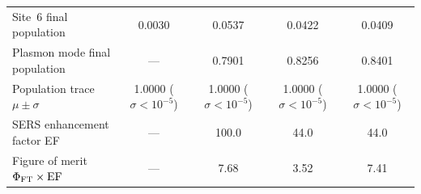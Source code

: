 \begin{table}[tbp]
{\begin{tabular}{l *{4}{S[table-format=3.4]} }
Site~6 final population & 0.0030 & 0.0537 & 0.0422 & 0.0409\\
Plasmon mode final population & {---} & 0.7901 & 0.8256 & 0.8401\\
Population trace $\mu\pm\sigma$ & {1.0000 ($\sigma<10^{-5}$)} & {1.0000 ($\sigma<10^{-5}$)} & {1.0000 ($\sigma<10^{-5}$)} & {1.0000 ($\sigma<10^{-5}$)}\\
\midrule
SERS enhancement factor EF & {---} & 100.0 & 44.0 & 44.0\\
Figure of merit $\Phi_{\rm FT}\times\mathrm{EF}$ & {---} & 7.68 & 3.52 & 7.41\\
\bottomrule
\end{tabular}%
}
\end{table}
